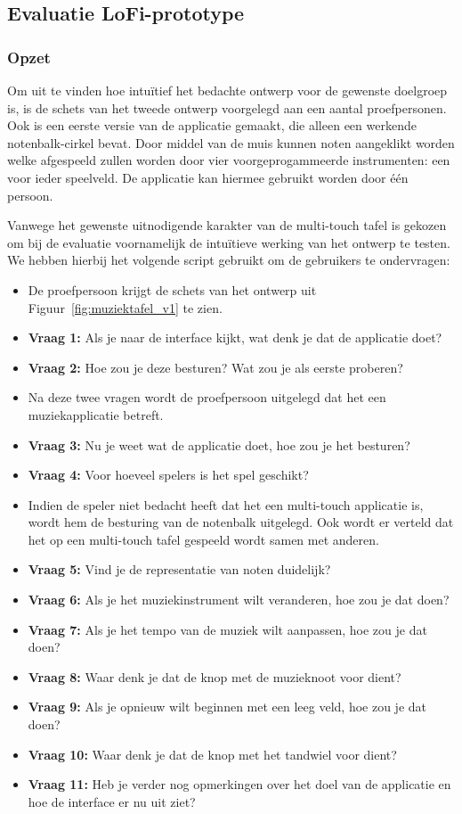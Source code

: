 \documentclass{acm}
\begin{document}
\subsection{Evaluatie LoFi-prototype}
\subsubsection{Opzet}
Om uit te vinden hoe intuïtief het bedachte ontwerp voor de gewenste doelgroep is, is de schets van het tweede ontwerp voorgelegd aan een aantal proefpersonen. Ook is een eerste versie van de applicatie gemaakt, die alleen een werkende notenbalk-cirkel bevat. Door middel van de muis kunnen noten aangeklikt worden welke afgespeeld zullen worden door vier voorgeprogammeerde instrumenten: een voor ieder speelveld. De applicatie kan hiermee gebruikt worden door één persoon.

Vanwege het gewenste uitnodigende karakter van de multi-touch tafel is gekozen om bij de evaluatie voornamelijk de intuïtieve werking van het ontwerp te testen. We hebben hierbij het volgende script gebruikt om de gebruikers te ondervragen:

\begin{itemize}
  \item De proefpersoon krijgt de schets van het ontwerp uit Figuur~\ref{fig:muziektafel_v1} te zien.
  \item \textbf{Vraag 1:} Als je naar de interface kijkt, wat denk je dat de applicatie doet?
  \item \textbf{Vraag 2:} Hoe zou je deze besturen? Wat zou je als eerste proberen?
  \item Na deze twee vragen wordt de proefpersoon uitgelegd dat het een muziekapplicatie betreft.
  \item \textbf{Vraag 3:} Nu je weet wat de applicatie doet, hoe zou je het besturen?
  \item \textbf{Vraag 4:} Voor hoeveel spelers is het spel geschikt?
  \item Indien de speler niet bedacht heeft dat het een multi-touch applicatie is, wordt hem de besturing van de notenbalk uitgelegd. Ook wordt er verteld dat het op een multi-touch tafel gespeeld wordt samen met anderen.
  \item \textbf{Vraag 5:} Vind je de representatie van noten duidelijk?
  \item \textbf{Vraag 6:} Als je het muziekinstrument wilt veranderen, hoe zou je dat doen?
  \item \textbf{Vraag 7:} Als je het tempo van de muziek wilt aanpassen, hoe zou je dat doen?
  \item \textbf{Vraag 8:} Waar denk je dat de knop met de muzieknoot voor dient?
  \item \textbf{Vraag 9:} Als je opnieuw wilt beginnen met een leeg veld, hoe zou je dat doen?
  \item \textbf{Vraag 10:} Waar denk je dat de knop met het tandwiel voor dient?
  \item \textbf{Vraag 11:} Heb je verder nog opmerkingen over het doel van de applicatie en hoe de interface er nu uit ziet?
\end{itemize}
\end{document}
